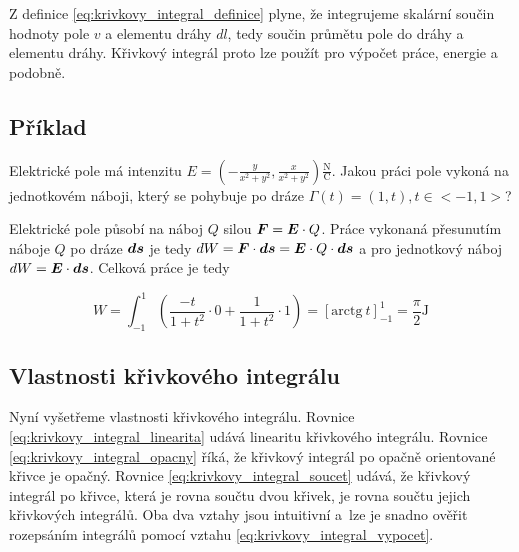 Z definice \eqref{eq:krivkovy_integral_definice} plyne, že integrujeme skalární součin hodnoty pole \(v\) a elementu dráhy \(dl\),
tedy součin průmětu pole do dráhy a elementu dráhy. Křivkový integrál proto lze použít pro výpočet práce, energie a podobně.


\subsection{Příklad}

Elektrické pole má intenzitu \(E = \left(-\frac{y}{x^2+y^2}, \frac{x}{x^2+y^2}\right) \frac{\mathrm{N}}{\mathrm{C}}\). Jakou práci pole vykoná na jednotkovém náboji, který se pohybuje po dráze \(\Gamma(t) = (1, t), t \in <-1, 1>\)?




Elektrické pole působí na náboj \(Q\) silou \(\boldsymbol{F} = \boldsymbol{E} \cdot Q\). Práce vykonaná přesunutím náboje \(Q\) po dráze \(\boldsymbol{ds}\) je tedy \(dW = \boldsymbol{F} \cdot \boldsymbol{ds} = \boldsymbol{E} \cdot Q \cdot \boldsymbol{ds}\) a pro jednotkový náboj \(dW = \boldsymbol{E} \cdot \boldsymbol{ds}\). Celková práce je tedy

\[
W = \int_{-1}^1 \left (\frac{-t}{1 + t^2} \cdot 0 + \frac{1}{1 + t^2} \cdot 1 \right) = \left[\mathrm{arctg} \ t\right]_{-1}^1 = \frac{\pi}{2} \mathrm{J}
\]

\subsection{Vlastnosti křivkového integrálu}

Nyní vyšetřeme vlastnosti křivkového integrálu. Rovnice \eqref{eq:krivkovy_integral_linearita} udává linearitu křivkového integrálu. Rovnice \eqref{eq:krivkovy_integral_opacny} říká, že křivkový integrál po opačně orientované křivce je opačný. Rovnice \eqref{eq:krivkovy_integral_soucet} udává, že křivkový integrál po křivce, která je rovna součtu dvou křivek, je rovna součtu jejich křivkových integrálů. Oba dva vztahy jsou intuitivní a~lze je snadno ověřit rozepsáním integrálů pomocí vztahu \eqref{eq:krivkovy_integral_vypocet}.

